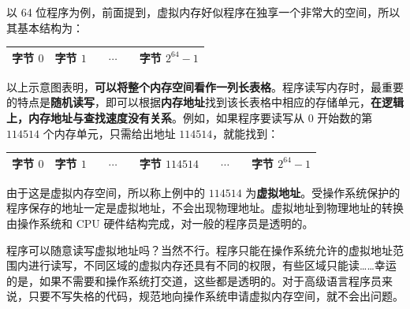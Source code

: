 以 64 位程序为例，前面提到，虚拟内存好似程序在独享一个非常大的空间，所以其基本结构为：
\begin{table}[H]
	\centering
	\begin{tabular}{|c|c|ccc|c|}
		\hline
		字节 $0$ & 字节 $1$ &  & $\cdots$ &  & 字节 $2^{64} - 1$
		\\\hline
	\end{tabular}
\end{table}

以上示意图表明，\textbf{可以将整个内存空间看作一列长表格}。程序读写内存时，最重要的特点是\textbf{随机读写}，即可以根据\textbf{内存地址}找到该长表格中相应的存储单元，\textbf{在逻辑上，内存地址与查找速度没有关系}。例如，如果程序要读写从 $0$ 开始数的第 $114514$ 个内存单元，只需给出地址 $114514$，就能找到：
\begin{table}[H]
	\centering
	\begin{tabular}{|c|c|ccc|c|ccc|c|}
		\hline
		字节 $0$ & 字节 $1$ &  & $\cdots$ &  & 字节 $114514$ &  & $\cdots$ &  & 字节 $2^{64} - 1$
		\\\hline
	\end{tabular}
\end{table}

由于这是虚拟内存空间，所以称上例中的 $114514$ 为\textbf{虚拟地址}。受操作系统保护的程序保存的地址一定是虚拟地址，不会出现物理地址。虚拟地址到物理地址的转换由操作系统和 CPU 硬件结构完成，对一般的程序员是透明的。

程序可以随意读写虚拟地址吗？当然不行。程序只能在操作系统允许的虚拟地址范围内进行读写，不同区域的虚拟内存还具有不同的权限，有些区域只能读……幸运的是，如果不需要和操作系统打交道，这些都是透明的。对于高级语言程序员来说，只要不写失格的代码，规范地向操作系统申请虚拟内存空间，就不会出问题。